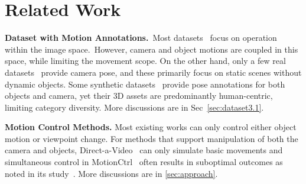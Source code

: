 \section{Related Work}
\label{sec:related_work}


\textbf{Dataset with Motion Annotations.}~Most datasets~\cite{MotionCtrl,DragNUWA} focus on operation within the image space.~However, camera and object motions are coupled in this space, while limiting the movement scope. On the other hand, only a few real datasets~\cite{Direct-A-Video,RealEstate-10K,MVImageNet} provide camera pose, and these primarily focus on static scenes without dynamic objects. Some synthetic datasets~\cite{SynBody,BEDLAM,WHAC,HumanVid} provide pose annotations for both objects and camera, yet their 3D assets are predominantly human-centric, limiting category diversity. More discussions are in Sec~\ref{sec:dataset3.1}.



\noindent\textbf{Motion Control Methods.}
Most existing works \cite{CameraCtrl,PEEKABOO,CamCo,Tora,3DTrajMaster} can only control either object motion or viewpoint change. For methods that support manipulation of both the camera and objects, Direct-a-Video~\cite{Direct-A-Video} can only simulate basic movements and simultaneous control in MotionCtrl~\cite{MotionCtrl} often results in suboptimal outcomes as noted in its study~\cite{MotionCtrl}. More discussions are in \cref{sec:approach}.

